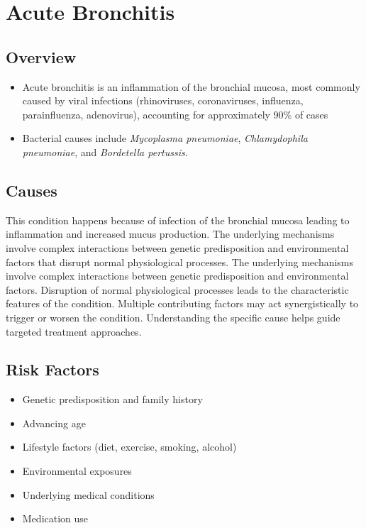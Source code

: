 \chapter{Acute Bronchitis}
\label{sec:Acute Bronchitis}

\section{Overview}


\begin{itemize}[noitemsep]
  \item Acute bronchitis is an inflammation of the bronchial mucosa, most commonly caused by viral infections (rhinoviruses, coronaviruses, influenza, parainfluenza, adenovirus), accounting for approximately 90\% of cases
  \item Bacterial causes include \textit{Mycoplasma pneumoniae}, \textit{Chlamydophila pneumoniae}, and \textit{Bordetella pertussis}.
\end{itemize}
\section{Causes}
This condition happens because of infection of the bronchial mucosa leading to inflammation and increased mucus production. The underlying mechanisms involve complex interactions between genetic predisposition and environmental factors that disrupt normal physiological processes. The underlying mechanisms involve complex interactions between genetic predisposition and environmental factors. Disruption of normal physiological processes leads to the characteristic features of the condition. Multiple contributing factors may act synergistically to trigger or worsen the condition. Understanding the specific cause helps guide targeted treatment approaches.
\section{Risk Factors}


\begin{itemize}[noitemsep]
  \item Genetic predisposition and family history
  \item Advancing age
  \item Lifestyle factors (diet, exercise, smoking, alcohol)
  \item Environmental exposures
  \item Underlying medical conditions
  \item Medication use
\end{itemize}
